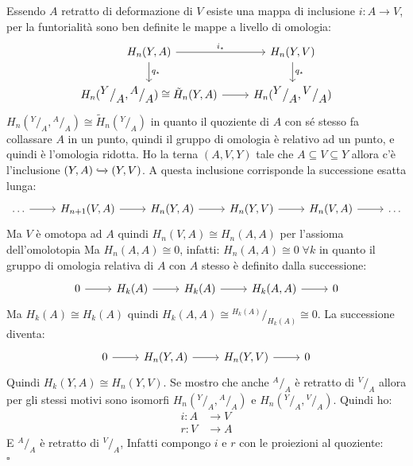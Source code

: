 \documentclass[10pt, twoside=false, x11names]{scrbook}
\newenvironment{proof}{{\textbf{Dimostrazione}:}}{\hfill $\square$}
\newcommand{\incl}{\xhookrightarrow{}}
\newcommand*\quot[2]{{^{\textstyle #1}\big/_{\textstyle #2}}}
\begin{document}
\begin{proof}
  Essendo $ A $ retratto di deformazione di $ V $ esiste
  una mappa di inclusione $ i \colon A \to V $, per la funtorialità
  sono ben definite le mappe a livello di omologia:
  \[
    \begin{tikzcd}
      H_n(Y,A) \rar{i_\star} \dar{q_\star} & H_n(Y,V) \dar{q_\star} \\
      H_n(\quot{Y}{A}, \quot{A}{A}) \cong \tilde{H}_n(Y,A) \rar & H_n(\quot{Y}{A}, \quot{V}{A})
    \end{tikzcd}
  \]
  $  H_n(\quot{Y}{A}, \quot{A}{A}) \cong \tilde{H}_n(\quot{Y}{A}) $ in quanto il quoziente
  di $ A $ con sé stesso fa collassare $ A $ in un punto, quindi il gruppo di omologia
  è relativo ad un punto, e quindi è l'omologia ridotta.
  Ho la terna $ (A, V, Y) $ tale che $ A \subseteq V \subseteq Y $ allora c'è l'inclusione
  $ (Y,A) \incl (Y,V) $. A questa inclusione corrisponde la successione esatta lunga:
  \[
    \begin{tikzcd}
      \dots \rar & H_{n+1}(V, A) \rar & H_n(Y, A) \rar & H_n(Y,V) \rar & H_{n}(V,A) \rar & \dots
    \end{tikzcd}
  \]
  Ma $ V $ è omotopa ad $ A $ quindi $ H_n(V,A) \cong H_n(A,A) $ per l'assioma dell'omolotopia
  Ma $ H_n(A,A) \cong 0 $, infatti:
  $ H_n(A,A) \cong 0 \; \forall k $ in quanto il gruppo di omologia relativa
  di $ A $ con $ A $ stesso è definito dalla successione:
  \[
    \begin{tikzcd}
      0 \rar   & H_k(A) \rar  & H_k(A) \rar  & H_k(A,A) \rar & 0
    \end{tikzcd}
  \]
  Ma $ H_k(A) \cong H_k(A) $ quindi  $ H_k(A,A) \cong \quot{H_k(A)}{H_k(A)} \cong 0 $.
  La successione diventa:
  \[
    \begin{tikzcd}
      0 \rar & H_n(Y, A) \rar & H_n(Y,V) \rar & 0
    \end{tikzcd}
  \]
  Quindi $ H_k(Y,A) \cong H_n(Y,V) $.
  Se mostro che anche $ \quot{A}{A} $ è retratto di $ \quot{V}{A} $
  allora per  gli stessi motivi sono isomorfi
  $ H_n(\quot{Y}{A}, \quot{A}{A}) $ e $ H_n(\quot{Y}{A}, \quot{V}{A}) $.
  Quindi ho:
  \begin{align*}
    i \colon A & \to V \\
    r \colon V & \to A
  \end{align*}
  E $ \quot{A}{A} $ è retratto di $ \quot{V}{A} $,
  Infatti compongo $ i $ e $ r $ con le proiezioni al quoziente:
  \begin{align*}

\end{align*}
\end{proof}
\end{document}
